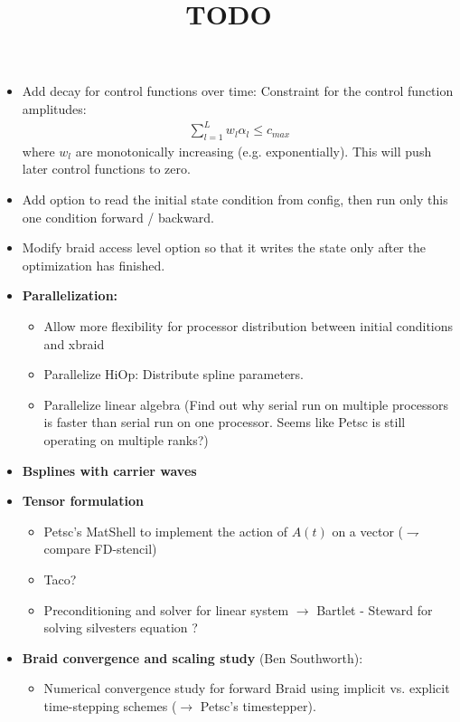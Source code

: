 \documentclass{article}
\title{TODO}
\begin{document}
\maketitle

\begin{itemize}
  \item Add decay for control functions over time: Constraint for the control function amplitudes:
      \begin{align*}
          \sum_{l=1}^L w_l\alpha_l \leq c_{max}
      \end{align*}
        where $w_l$ are monotonically increasing (e.g. exponentially). This will push later control functions to zero. 
  \item Add option to read the initial state condition from config, then run only this one condition forward / backward.
  \item Modify braid access level option so that it writes the state only after the optimization has finished. 
  \item \textbf{Parallelization:}
      \begin{itemize}
        \item Allow more flexibility for processor distribution between initial conditions and xbraid
        \item Parallelize HiOp: Distribute spline parameters.
        \item Parallelize linear algebra (Find out why serial run on multiple processors is faster than serial run on one processor. Seems like Petsc is still operating on multiple ranks?)
      \end{itemize}
  \item \textbf{Bsplines with carrier waves}
  \item \textbf{Tensor formulation}
        \begin{itemize}
          \item Petsc's MatShell to implement the action of $A(t)$ on a vector ($\rightharpoondown$ compare FD-stencil)
          \item Taco?
          \item Preconditioning and solver for linear system $\rightarrow$ Bartlet - Steward for solving silvesters equation ?
        \end{itemize}
  \item \textbf{Braid convergence and scaling study} (Ben Southworth):
        \begin{itemize}
          \item Numerical convergence study for forward Braid using implicit vs. explicit time-stepping schemes ($\rightarrow$ Petsc's timestepper).

\end{itemize}
\end{itemize}
\end{document}
